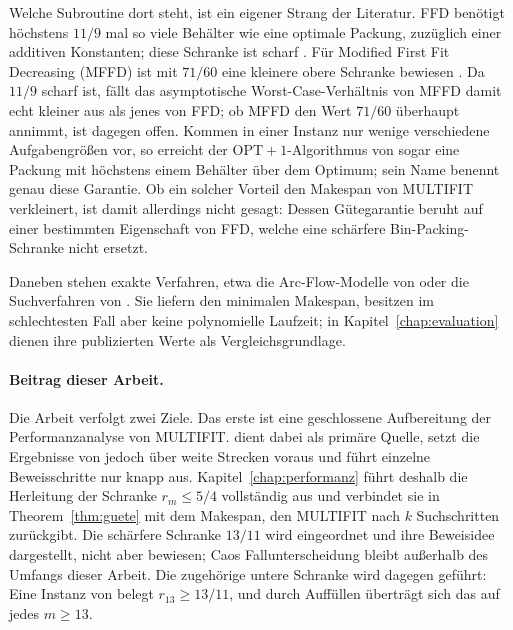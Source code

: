 Welche Subroutine dort steht, ist ein eigener Strang der Literatur.
FFD benötigt höchstens $11/9$ mal so viele Behälter wie eine optimale Packung, zuzüglich einer
additiven Konstanten; diese Schranke ist scharf \cite{dosa2007}.
Für Modified First Fit Decreasing (MFFD) ist mit $71/60$ eine kleinere obere Schranke bewiesen
\cite{johnson_garey1985, yue_zhang1995}.
Da $11/9$ scharf ist, fällt das asymptotische Worst-Case-Verhältnis von MFFD damit echt kleiner
aus als jenes von FFD; ob MFFD den Wert $71/60$ überhaupt annimmt, ist dagegen offen.
Kommen in einer Instanz nur wenige verschiedene Aufgabengrößen vor, so erreicht der
$\mathrm{OPT}+1$-Algorithmus von \textcite{jansen_solisoba2010} sogar eine Packung mit höchstens
einem Behälter über dem Optimum; sein Name benennt genau diese Garantie.
Ob ein solcher Vorteil den Makespan von MULTIFIT verkleinert, ist damit allerdings nicht gesagt:
Dessen Gütegarantie beruht auf einer bestimmten Eigenschaft von FFD, welche eine schärfere
Bin-Packing-Schranke nicht ersetzt.

Daneben stehen exakte Verfahren, etwa die Arc-Flow-Modelle von \textcite{mrad2018} oder die
Suchverfahren von \textcite{akram2025}.
Sie liefern den minimalen Makespan, besitzen im schlechtesten Fall aber keine polynomielle
Laufzeit; in Kapitel~\ref{chap:evaluation} dienen ihre publizierten Werte als Vergleichsgrundlage.

\paragraph{Beitrag dieser Arbeit.}
Die Arbeit verfolgt zwei Ziele.
Das erste ist eine geschlossene Aufbereitung der Performanzanalyse von MULTIFIT.
\textcite{cao1995} dient dabei als primäre Quelle, setzt die Ergebnisse von
\textcite{coffman1978} jedoch über weite Strecken voraus und führt einzelne Beweisschritte nur
knapp aus.
Kapitel~\ref{chap:performanz} führt deshalb die Herleitung der Schranke $r_m \le 5/4$
vollständig aus und verbindet sie in Theorem~\ref{thm:guete} mit dem Makespan, den MULTIFIT nach
$k$ Suchschritten zurückgibt.
Die schärfere Schranke $13/11$ wird eingeordnet und ihre Beweisidee dargestellt, nicht aber
bewiesen; Caos Fallunterscheidung bleibt außerhalb des Umfangs dieser Arbeit.
Die zugehörige untere Schranke wird dagegen geführt: Eine Instanz von \textcite{friesen1984}
belegt $r_{13} \ge 13/11$, und durch Auffüllen überträgt sich das auf jedes $m \ge 13$.

